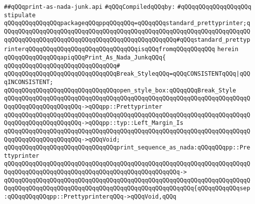 \label{src/lib/compiler/front/typer/print/print-as-nada-junk.api}
\verb|##qQQqprint-as-nada-junk.api|\newline
\newline
\verb|#qQQqCompiledqQQqby:|\newline
\verb|#qQQqqQQqqQQqqQQqqQQq|\newline
\newline
\verb|stipulate|\newline
\verb|qQQqqQQqqQQqqQQqpackageqQQqppqQQqqQQq=qQQqqQQqstandard_prettyprinter;qQQqqQQqqQQqqQQqqQQqqQQqqQQqqQQqqQQqqQQqqQQqqQQqqQQqqQQqqQQqqQQqqQQqqQQqqQQqqQQqqQQqqQQqqQQqqQQqqQQqqQQqqQQqqQQqqQQqqQQq#qQQqstandard_prettyprinterqQQqqQQqqQQqqQQqqQQqqQQqqQQqqQQqisqQQqfromqQQqqQQqqQQq|\newline
\verb|herein|\newline
\newline
\verb|qQQqqQQqqQQqqQQqapiqQQqPrint_As_Nada_JunkqQQq{|\newline
\verb|qQQqqQQqqQQqqQQqqQQqqQQqqQQqqQQq#|\newline
\verb|qQQqqQQqqQQqqQQqqQQqqQQqqQQqqQQqBreak_StyleqQQq=qQQqCONSISTENTqQQq|\verb#|qQQqINCONSISTENT;#\newline
\newline
\verb|qQQqqQQqqQQqqQQqqQQqqQQqqQQqqQQqopen_style_box:qQQqqQQqBreak_Style|\newline
\verb|qQQqqQQqqQQqqQQqqQQqqQQqqQQqqQQqqQQqqQQqqQQqqQQqqQQqqQQqqQQqqQQqqQQqqQQqqQQqqQQqqQQqqQQqqQQq->qQQqpp::Prettyprinter|\newline
\verb|qQQqqQQqqQQqqQQqqQQqqQQqqQQqqQQqqQQqqQQqqQQqqQQqqQQqqQQqqQQqqQQqqQQqqQQqqQQqqQQqqQQqqQQqqQQq->qQQqpp::typ::Left_Margin_Is|\newline
\verb|qQQqqQQqqQQqqQQqqQQqqQQqqQQqqQQqqQQqqQQqqQQqqQQqqQQqqQQqqQQqqQQqqQQqqQQqqQQqqQQqqQQqqQQqqQQq->qQQqVoid;|\newline
\newline
\verb|qQQqqQQqqQQqqQQqqQQqqQQqqQQqqQQqprint_sequence_as_nada:qQQqqQQqpp::Prettyprinter|\newline
\verb|qQQqqQQqqQQqqQQqqQQqqQQqqQQqqQQqqQQqqQQqqQQqqQQqqQQqqQQqqQQqqQQqqQQqqQQqqQQqqQQqqQQqqQQqqQQqqQQqqQQqqQQqqQQqqQQqqQQqqQQq->|\newline
\verb|qQQqqQQqqQQqqQQqqQQqqQQqqQQqqQQqqQQqqQQqqQQqqQQqqQQqqQQqqQQqqQQqqQQqqQQqqQQqqQQqqQQqqQQqqQQqqQQqqQQqqQQqqQQqqQQqqQQqqQQqqQQq{qQQqqQQqqQQqsep:qQQqqQQqqQQqpp::PrettyprinterqQQq->qQQqVoid,qQQq|\newline
